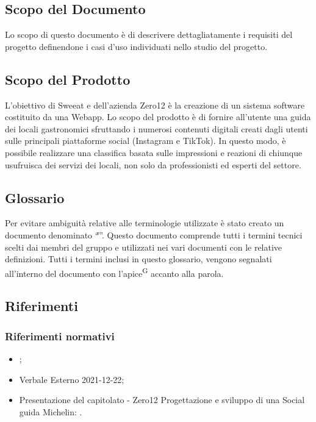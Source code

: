 
\subsection{Scopo del Documento}
Lo scopo di questo documento è di descrivere dettagliatamente i requisiti del progetto definendone i casi d’uso individuati nello studio del progetto.

\subsection{Scopo del Prodotto}

L’obiettivo di Sweeat e dell’azienda Zero12 è la creazione di un sistema software costituito da una Webapp. Lo scopo del prodotto è di fornire all’utente una guida dei locali gastronomici sfruttando i numerosi contenuti digitali creati dagli utenti sulle principali piattaforme social (Instagram e TikTok). In questo modo, è possibile realizzare una classifica basata sulle impressioni e reazioni di chiunque usufruisca dei servizi dei locali, non solo da professionisti ed esperti del settore.

\subsection{Glossario}

Per evitare ambiguità relative alle terminologie utilizzate è stato creato un documento denominato “\textit{\G}”. Questo documento comprende tutti i termini tecnici scelti dai membri del gruppo e utilizzati nei vari documenti con le relative definizioni. Tutti i termini inclusi in questo glossario, vengono segnalati all’interno del documento con l’apice\textsuperscript{G} accanto alla parola.

\subsection{Riferimenti}

\subsubsection{Riferimenti normativi}
\begin{itemize}
    \item \NdP{};
    \item Verbale Esterno 2021-12-22;
    \item Presentazione del capitolato - Zero12 Progettazione e sviluppo di una Social guida Michelin: \newline {}.
\end{itemize}
